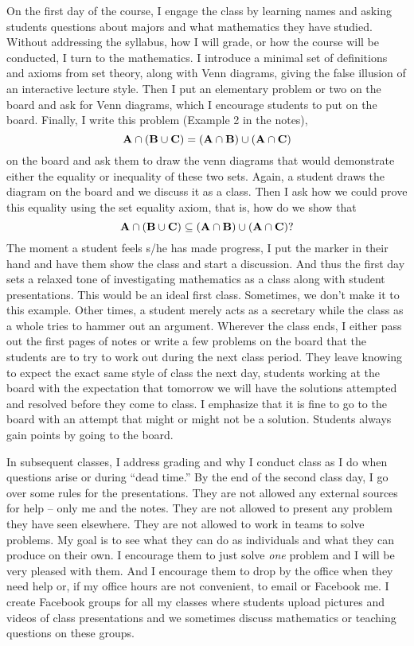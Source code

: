 \begin{annotation}
On the first day of the course, I engage the class  by learning names and asking students questions about majors and what mathematics they have studied.   Without addressing the syllabus, how I will grade, or how the course will be conducted, I turn to the mathematics. I introduce a minimal set of definitions and axioms from set theory, along with Venn diagrams, giving the false illusion of an interactive lecture style.  Then I put an elementary problem or two on the board and ask for Venn diagrams, which I encourage students to put on the board.  Finally, I write this problem (Example 2 in the notes), $$\mathbf A \cap (\mathbf B \cup \mathbf C) = (\mathbf A \cap \mathbf B) \cup (\mathbf A \cap \mathbf C)$$ on the board and ask them to draw the venn diagrams that would demonstrate either the equality or inequality of these two sets.  Again, a student draws the diagram on the board and we discuss it as a class. Then I ask how we could prove this equality using the set equality axiom, that is, how do we show that $$\mathbf A \cap (\mathbf B \cup \mathbf C) \subseteq (\mathbf A \cap \mathbf B) \cup (\mathbf A \cap \mathbf C)?$$  The moment a student feels s/he has made progress, I put the marker in their hand and have them show the class and start a discussion.  And thus the first day sets a relaxed tone of investigating mathematics as a class along with student presentations.   This would be an ideal first class.  Sometimes, we don't make it to this example. Other times, a student merely acts as a secretary while the class as a whole tries to hammer out an argument. Wherever the class ends, I either pass out the first pages of notes or write a few problems on the board that the students are to try to work out during the next class period.  They leave knowing to expect the exact same style of class the next day, students working at the board with the expectation that tomorrow we will have the solutions attempted and resolved before they come to class.  I emphasize that it is fine to go to the board with an attempt that might or might not be a solution.  Students always gain points by going to the board.

In subsequent classes, I address grading and why I conduct class as I do when questions arise or during ``dead time.'' By the end of the second class day, I go over some rules for the presentations.   They are not allowed any external sources for help -- only me and the notes. They are not allowed to present any problem they have seen elsewhere.  They are not allowed to work in teams to solve problems.   My goal is to see what they can do as individuals and what they can produce on their own.  I encourage them to just solve \emph{one} problem and I will be very pleased with them.  And I encourage them to drop by the office when they need help or, if my office hours are not convenient, to email or Facebook me.   I create Facebook groups for all my classes where students upload pictures and videos of class presentations and we sometimes discuss mathematics or teaching questions on these groups.


\end{annotation}
